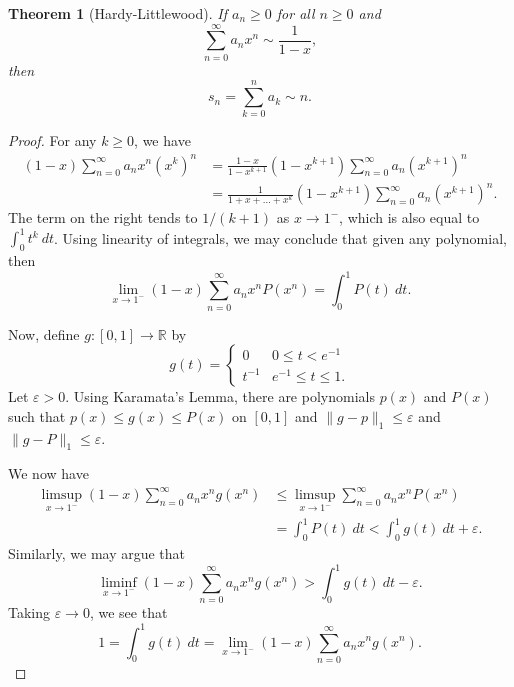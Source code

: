 \documentclass[12pt]{amsart}
\newtheorem{theorem}{Theorem}
\newcommand{\R}{\mathbb{R}}
\begin{document}
\begin{enumerate}[label=(\alph*)]
\begin{theorem}[Hardy-Littlewood]
	If $a_n\ge 0$ for all $n\ge 0$ and 
	\begin{equation*}
		\sum_{n = 0}^\infty a_nx^n\sim\frac{1}{1 - x},
	\end{equation*}
	then 
	\begin{equation*}
		s_n = \sum_{k = 0}^n a_k\sim n.
	\end{equation*}
\end{theorem}
\begin{proof}
	For any $k\ge 0$, we have 
	\begin{align*}
		(1 - x)\sum_{n = 0}^\infty a_n x^n (x^k)^n &= \frac{1 - x}{1 - x^{k + 1}}(1 - x^{k + 1})\sum_{n = 0}^\infty a_n (x^{k + 1})^n\\
		&= \frac{1}{1 + x + \dots + x^k}(1 - x^{k + 1})\sum_{n = 0}^\infty a_n (x^{k + 1})^n.
	\end{align*}
	The term on the right tends to $1/(k + 1)$ as $x\to 1^-$, which is also equal to $\int_0^1 t^k~dt$. Using linearity of integrals, we may conclude that given any polynomial, then 
	\begin{equation*}
		\lim_{x\to 1^-}(1 - x)\sum_{n = 0}^\infty a_nx^nP(x^n) = \int_0^1 P(t)~dt.
	\end{equation*}

	Now, define $g: [0,1]\to\R$ by 
	\begin{equation*}
		g(t) = 
		\begin{cases}
			0 & 0\le t < e^{-1}\\
			t^{-1} & e^{-1}\le t\le 1.
		\end{cases}
	\end{equation*}
	Let $\varepsilon > 0$. Using Karamata's Lemma, there are polynomials $p(x)$ and $P(x)$ such that $p(x)\le g(x)\le P(x)$ on $[0, 1]$ and $\|g - p\|_1 \le\varepsilon$ and $\|g - P\|_1\le\varepsilon$.

	We now have 
	\begin{align*}
		\limsup_{x\to 1^-} (1 - x)\sum_{n = 0}^\infty a_nx^ng(x^n) &\le\limsup_{x\to 1^-}\sum_{n = 0}^\infty a_nx^n P(x^n)\\
		&= \int_0^1 P(t)~dt < \int_0^1 g(t)~dt + \varepsilon.
	\end{align*}
	Similarly, we may argue that 
	\begin{equation*}
		\liminf_{x\to 1^-} (1 - x)\sum_{n = 0}^\infty a_nx^ng(x^n) > \int_0^1 g(t)~dt - \varepsilon.
	\end{equation*}
	Taking $\varepsilon\to 0$, we see that 
	\begin{equation*}
		1 = \int_0^1 g(t)~dt = \lim_{x\to 1^-}(1 - x)\sum_{n = 0}^\infty a_nx^ng(x^n).
	\end{equation*}


\end{proof}
\end{enumerate}
\end{document}
